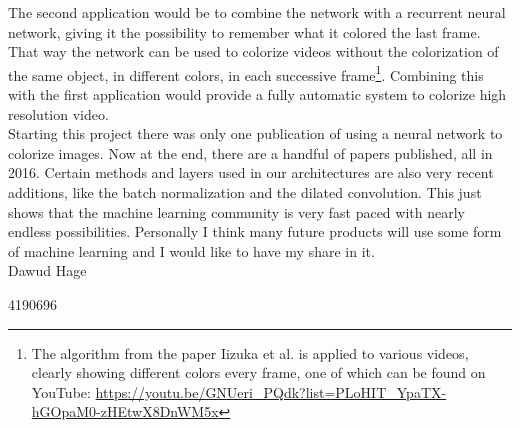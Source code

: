 \documentclass[a4paper]{article}
\begin{document}
The second application would be to combine the network with a recurrent neural network, giving it the possibility to remember what it colored the last frame. That way the network can be used to colorize videos without the colorization of the same object, in different colors, in each successive frame\footnote{The algorithm from the paper Iizuka et al. is applied to various videos, clearly showing different colors every frame, one of which can be found on YouTube: \url{https://youtu.be/GNUeri_PQdk?list=PLoHIT_YpaTX-hGOpaM0-zHEtwX8DnWM5x}}. Combining this with the first application would provide a fully automatic system to colorize high resolution video.\\

Starting this project there was only one publication of using a neural network to colorize images. Now at the end, there are a handful of papers published, all in 2016. Certain methods and layers used in our architectures are also very recent additions, like the batch normalization and the dilated convolution. This just shows that the machine learning community is very fast paced with nearly endless possibilities. Personally I think many future products will use some form of machine learning and I would like to have my share in it. \\

Dawud Hage

4190696



 
\end{document}
